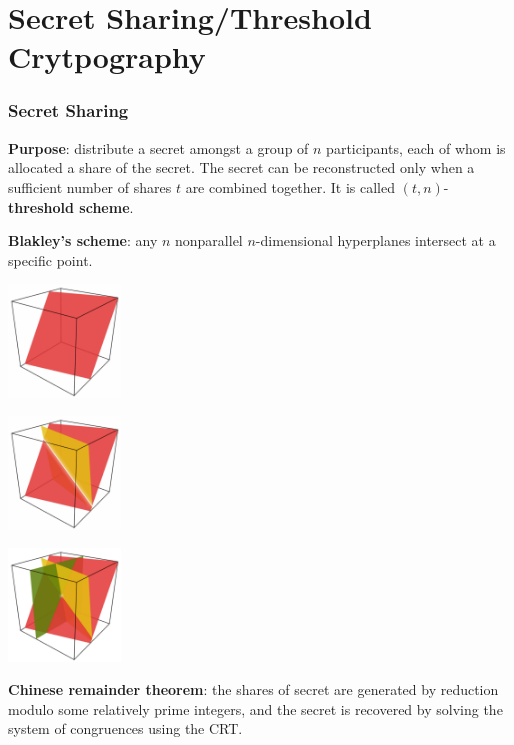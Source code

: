 \section{Secret Sharing/Threshold Crytpography}
\begin{frame}\frametitle{Secret Sharing}
\textbf{Purpose}: distribute a secret amongst a group of $n$ participants, each of whom is allocated a share of the secret. The secret can be reconstructed only when a sufficient number of shares $t$ are combined together. It is called $(t, n)$-\textbf{threshold scheme}.
\newline

\textbf{Blakley's scheme}: any $n$ nonparallel $n$-dimensional hyperplanes intersect at a specific point.

  \begin{minipage}[t]{0.32\linewidth} 
    \centering 
    \includegraphics[width=30mm]{pic/Secretsharing-1} 
  \end{minipage}%
  \begin{minipage}[t]{0.32\linewidth} 
    \centering 
    \includegraphics[width=30mm]{pic/Secretsharing-2} 
  \end{minipage}
  \begin{minipage}[t]{0.32\linewidth} 
    \centering 
    \includegraphics[width=30mm]{pic/Secretsharing-3}  
  \end{minipage} 

\textbf{Chinese remainder theorem}: the shares of secret are generated by reduction modulo some relatively prime integers, and the secret is recovered by solving the system of congruences using the CRT.
\end{frame}
